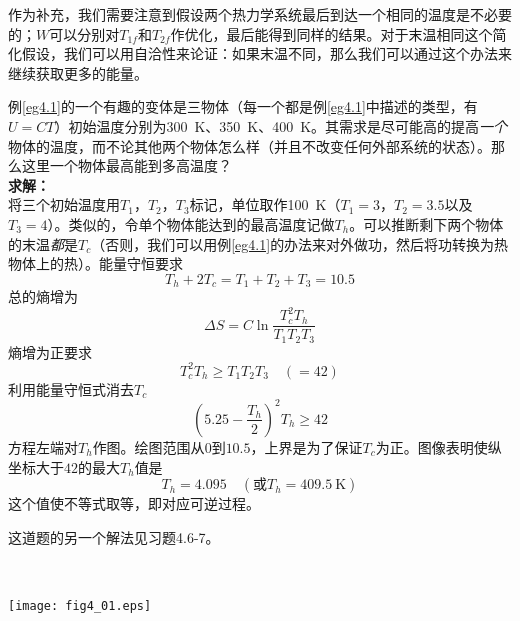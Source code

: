 作为补充，我们需要注意到假设两个热力学系统最后到达一个相同的温度是不必要的；$W$可以分别对$T_{1f}$和$T_{2f}$作优化，最后能得到同样的结果。对于末温相同这个简化假设，我们可以用自洽性来论证：如果末温不同，那么我们可以通过这个办法来继续获取更多的能量。

\begin{example}
例\ref{eg4.1}的一个有趣的变体是三物体（每一个都是例\ref{eg4.1}中描述的类型，有$U=CT$）初始温度分别为\SI{300}{\kelvin}、\SI{350}{\kelvin}、\SI{400}{\kelvin}。其需求是尽可能高的提高{\it 一个}物体的温度，而不论其他两个物体怎么样（并且不改变任何外部系统的状态）。那么这里一个物体最高能到多高温度？\\
{\bf 求解：}\\
将三个初始温度用$T_1$，$T_2$，$T_3$标记，单位取作\SI{100}{\kelvin}（$T_1=3$，$T_2=3.5$以及$T_3=4$）。类似的，令单个物体能达到的最高温度记做$T_h$。可以推断剩下两个物体的末温{\it 都}是$T_c$（否则，我们可以用例\ref{eg4.1}的办法来对外做功，然后将功转换为热物体上的热）。能量守恒要求
\[
T_h + 2T_c = T_1 + T_2 + T_3 = 10.5
\]
总的熵增为
\[
\Delta S = C\ln\frac{T_c^2T_h}{T_1T_2T_3}
\]
熵增为正要求
\[
T_c^2T_h \ge T_1T_2T_3 \quad (=42)
\]
利用能量守恒式消去$T_c$
\[
(5.25-\frac{T_h}{2})^2T_h\ge 42
\]
方程左端对$T_h$作图。绘图范围从$0$到$10.5$，上界是为了保证$T_c$为正。图像表明使纵坐标大于$42$的最大$T_h$值是
\[
T_h = 4.095 \quad(\text{或}T_h = \SI{409.5}{\kelvin})
\]
这个值使不等式取等，即对应可逆过程。
\end{example}

这道题的另一个解法见习题4.6-7。

\ 

{
	\centering
	\texttt{[image: fig4\_01.eps]} 
	\figcaption{ }
}

